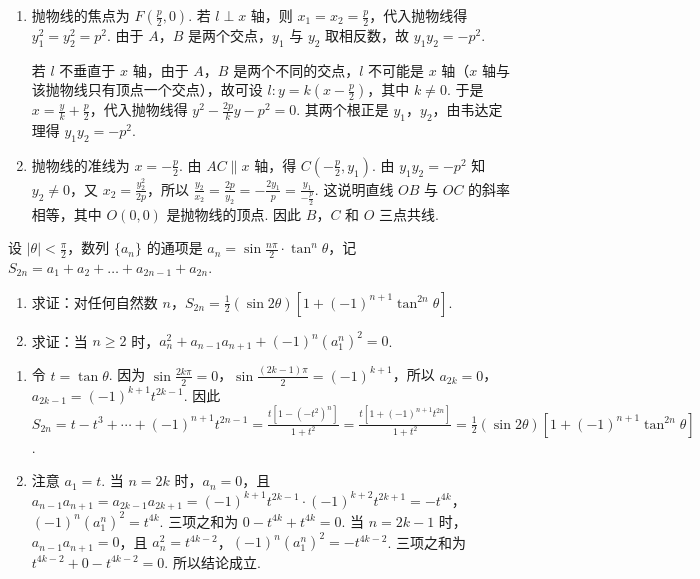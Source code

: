 \documentclass[UTF8,a4paper,oneside,11pt]{ctexbook}
\begin{document}
\begin{solution}
\begin{enumerate}
\item
抛物线的焦点为 \(F\left(\frac p2,0\right)\). 若 \(l\perp x\) 轴，则 \(x_{1}=x_{2}=\frac p2\)，代入抛物线得 \(y_{1}^{2}=y_{2}^{2}=p^{2}\). 由于 \(A\)，\(B\) 是两个交点，\(y_{1}\) 与 \(y_{2}\) 取相反数，故 \(y_{1}y_{2}=-p^{2}\).

若 \(l\) 不垂直于 \(x\) 轴，由于 \(A\)，\(B\) 是两个不同的交点，\(l\) 不可能是 \(x\) 轴（\(x\) 轴与该抛物线只有顶点一个交点），故可设 \(l:y=k\left(x-\frac p2\right)\)，其中 \(k\neq0\). 于是 \(x=\frac yk+\frac p2\)，代入抛物线得 \(y^{2}-\frac{2p}{k}y-p^{2}=0\). 其两个根正是 \(y_{1}\)，\(y_{2}\)，由韦达定理得 \(y_{1}y_{2}=-p^{2}\).
\item
抛物线的准线为 \(x=-\frac p2\). 由 \(AC\parallel x\) 轴，得 \(C\left(-\frac p2,y_{1}\right)\). 由 \(y_{1}y_{2}=-p^{2}\) 知 \(y_{2}\neq0\)，又 \(x_{2}=\frac{y_{2}^{2}}{2p}\)，所以
\(\frac{y_{2}}{x_{2}}=\frac{2p}{y_{2}}=-\frac{2y_{1}}{p}=\frac{y_{1}}{-\frac{p}{2}}\).
这说明直线 \(OB\) 与 \(OC\) 的斜率相等，其中 \(O(0,0)\) 是抛物线的顶点. 因此 \(B\)，\(C\) 和 \(O\) 三点共线.
\end{enumerate}
\end{solution}

\begin{problem}
设 \(|\theta|<\frac\pi2\)，数列 \(\{a_n\}\) 的通项是 \(a_n=\sin\frac{n\pi}{2}\cdot\tan^{n}\theta\)，记 \(S_{2n}=a_{1}+a_{2}+\dots+a_{2n-1}+a_{2n}\).
\begin{enumerate}
\item 求证：对任何自然数 \(n\)，\(S_{2n}=\frac12(\sin2\theta)[1+(-1)^{n+1}\tan^{2n}\theta]\).
\item 求证：当 \(n\geqslant2\) 时，\(a_n^{2}+a_{n-1}a_{n+1}+(-1)^n(a_{1}^{n})^{2}=0\).
\end{enumerate}
\end{problem}

\begin{solution}
\begin{enumerate}
\item
令 \(t=\tan\theta\). 因为 \(\sin\frac{2k\pi}{2}=0\)，\(\sin\frac{(2k-1)\pi}{2}=(-1)^{k+1}\)，所以 \(a_{2k}=0\)，\(a_{2k-1}=(-1)^{k+1}t^{2k-1}\). 因此
\(S_{2n}=t-t^{3}+\cdots+(-1)^{n+1}t^{2n-1}=\frac{t\left[1-(-t^{2})^{n}\right]}{1+t^{2}}=\frac{t\left[1+(-1)^{n+1}t^{2n}\right]}{1+t^{2}}=\frac12(\sin2\theta)\left[1+(-1)^{n+1}\tan^{2n}\theta\right]\).
\item
注意 \(a_{1}=t\). 当 \(n=2k\) 时，\(a_{n}=0\)，且
\(a_{n-1}a_{n+1}=a_{2k-1}a_{2k+1}=(-1)^{k+1}t^{2k-1}\cdot(-1)^{k+2}t^{2k+1}=-t^{4k}\)，
\((-1)^{n}(a_{1}^{n})^{2}=t^{4k}\). 三项之和为 \(0-t^{4k}+t^{4k}=0\).
当 \(n=2k-1\) 时，\(a_{n-1}a_{n+1}=0\)，且 \(a_{n}^{2}=t^{4k-2}\)，\((-1)^{n}(a_{1}^{n})^{2}=-t^{4k-2}\). 三项之和为 \(t^{4k-2}+0-t^{4k-2}=0\). 所以结论成立.
\end{enumerate}
\end{solution}

\end{document}
